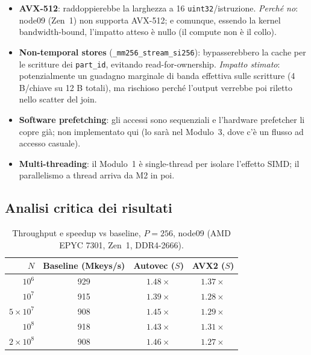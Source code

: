 \documentclass[11pt,a4paper]{article}
\theoremstyle{remark}
\begin{document}
\begin{itemize}
  \item \textbf{AVX-512}: raddoppierebbe la larghezza a 16 \texttt{uint32}/istruzione. \emph{Perch\'e no}: node09 (Zen~1) non supporta AVX-512; e comunque, essendo la kernel bandwidth-bound, l'impatto atteso \`e nullo (il compute non \`e il collo).
  \item \textbf{Non-temporal stores} (\texttt{\_mm256\_stream\_si256}): bypasserebbero la cache per le scritture dei \texttt{part\_id}, evitando read-for-ownership. \emph{Impatto stimato}: potenzialmente un guadagno marginale di banda effettiva sulle scritture (4 B/chiave su 12 B totali), ma rischioso perch\'e l'output verrebbe poi riletto nello scatter del join.
  \item \textbf{Software prefetching}: gli accessi sono sequenziali e l'hardware prefetcher li copre gi\`a; non implementato qui (lo sar\`a nel Modulo~3, dove c'\`e un flusso ad accesso casuale).
  \item \textbf{Multi-threading}: il Modulo~1 \`e single-thread per isolare l'effetto SIMD; il parallelismo a thread arriva da M2 in poi.
\end{itemize}

\subsection{Analisi critica dei risultati}

\begin{table}[H]
\centering\small
\begin{tabular}{@{}rccc@{}}
\toprule
$N$ & Baseline (Mkeys/s) & Autovec ($S$) & AVX2 ($S$) \\
\midrule
$10^6$            & 929 & $1.48\times$ & $1.37\times$ \\
$10^7$            & 915 & $1.39\times$ & $1.28\times$ \\
$5{\times}10^7$   & 908 & $1.45\times$ & $1.29\times$ \\
$10^8$            & 918 & $1.43\times$ & $1.31\times$ \\
$2{\times}10^8$   & 908 & $1.46\times$ & $1.27\times$ \\
\bottomrule
\end{tabular}
\caption{Throughput e speedup vs baseline, $P=256$, node09 (AMD EPYC 7301, Zen~1, DDR4-2666).}
\label{tab:m1}
\end{table}
\end{document}
